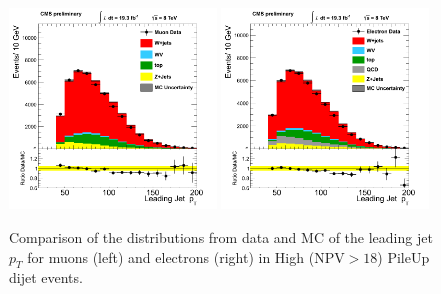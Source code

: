 \begin{figure}[h!t]
  {\centering
    \includegraphics[width=0.49\textwidth]{figs/puchecks/mu_HighNPV_jetld_pt.png}
    \includegraphics[width=0.49\textwidth]{figs/puchecks/el_HighNPV_jetld_pt.png}
    \caption{Comparison of the distributions from data and MC of the
    leading jet $p_T$ for muons (left) and electrons (right)
    in High (NPV$>18$) PileUp dijet events.}
\label{fig:pu_jetldHigh}}
\end{figure}
